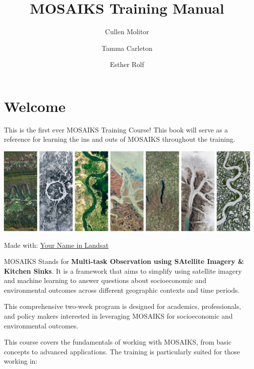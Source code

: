 \documentclass[
  letterpaper,
  DIV=11,
  numbers=noendperiod]{scrreprt}
\title{MOSAIKS Training Manual}
\author{Cullen Molitor \and Tamma Carleton \and Esther Rolf}
\date{}
\renewcommand*\contentsname{Table of contents}
\newcommand\contentsname{Table of contents}
\begin{document}
\maketitle
\ifdefined\Shaded\renewenvironment{Shaded}{\begin{tcolorbox}[frame hidden, sharp corners, boxrule=0pt, borderline west={3pt}{0pt}{shadecolor}, enhanced, interior hidden, breakable]}{\end{tcolorbox}}\fi

\renewcommand*\contentsname{Table of contents}
{
\hypersetup{linkcolor=}
\setcounter{tocdepth}{2}
\tableofcontents
}

\hypertarget{welcome}{%
\chapter*{Welcome}\label{welcome}}


This is the first ever MOSAIKS Training Course! This book will serve as
a reference for learning the ins and outs of MOSAIKS throughout the
training.

\includegraphics{images/mosaiks-in-landsat.png}

Made with:
\href{https://landsat.gsfc.nasa.gov/apps/YourNameInLandsat-main/}{Your
Name in Landsat}

MOSAIKS Stands for \textbf{Multi-task Observation using SAtellite
Imagery \& Kitchen Sinks}. It is a framework that aims to simplify using
satellite imagery and machine learning to answer questions about
socioeconomic and environmental outcomes across different geographic
contexts and time periods.

This comprehensive two-week program is designed for academics,
professionals, and policy makers interested in leveraging MOSAIKS for
socioeconomic and environmental outcomes.

This course covers the fundamentals of working with MOSAIKS, from basic
concepts to advanced applications. The training is particularly suited
for those working in:
\end{document}
